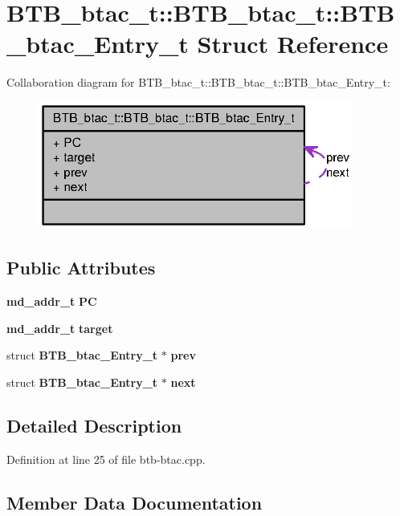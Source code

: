 \section{BTB\_\-btac\_\-t::BTB\_\-btac\_\-t::BTB\_\-btac\_\-Entry\_\-t Struct Reference}
\label{structBTB__btac__t_1_1BTB__btac__Entry__t}
Collaboration diagram for BTB\_\-btac\_\-t::BTB\_\-btac\_\-t::BTB\_\-btac\_\-Entry\_\-t:\nopagebreak
\begin{figure}[H]
\begin{center}
\leavevmode
\includegraphics[width=293pt]{structBTB__btac__t_1_1BTB__btac__Entry__t__coll__graph}
\end{center}
\end{figure}
\subsection*{Public Attributes}
\begin{CompactItemize}
\item 
{\bf md\_\-addr\_\-t} {\bf PC}
\item 
{\bf md\_\-addr\_\-t} {\bf target}
\item 
struct {\bf BTB\_\-btac\_\-Entry\_\-t} $\ast$ {\bf prev}
\item 
struct {\bf BTB\_\-btac\_\-Entry\_\-t} $\ast$ {\bf next}
\end{CompactItemize}


\subsection{Detailed Description}


Definition at line 25 of file btb-btac.cpp.

\subsection{Member Data Documentation}
